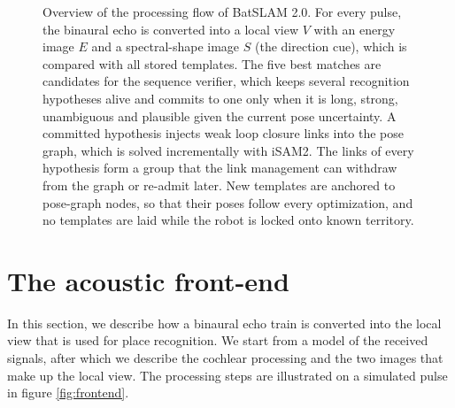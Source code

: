 \documentclass[journal]{IEEEtran}
\begin{document}
\begin{figure}[t]
\caption{Overview of the processing flow of BatSLAM 2.0. For every pulse, the binaural echo is converted into a local view $V$ with an energy image $E$ and a spectral-shape image $S$ (the direction cue), which is compared with all stored templates. The five best matches are candidates for the sequence verifier, which keeps several recognition hypotheses alive and commits to one only when it is long, strong, unambiguous and plausible given the current pose uncertainty. A committed hypothesis injects weak loop closure links into the pose graph, which is solved incrementally with iSAM2. The links of every hypothesis form a group that the link management can withdraw from the graph or re-admit later. New templates are anchored to pose-graph nodes, so that their poses follow every optimization, and no templates are laid while the robot is locked onto known territory.}
\label{fig:overview}
\end{figure}

\section{The acoustic front-end}
\label{sec:frontend}
In this section, we describe how a binaural echo train is converted into the local view that is used for place recognition. We start from a model of the received signals, after which we describe the cochlear processing and the two images that make up the local view. The processing steps are illustrated on a simulated pulse in figure \ref{fig:frontend}.
\end{document}
